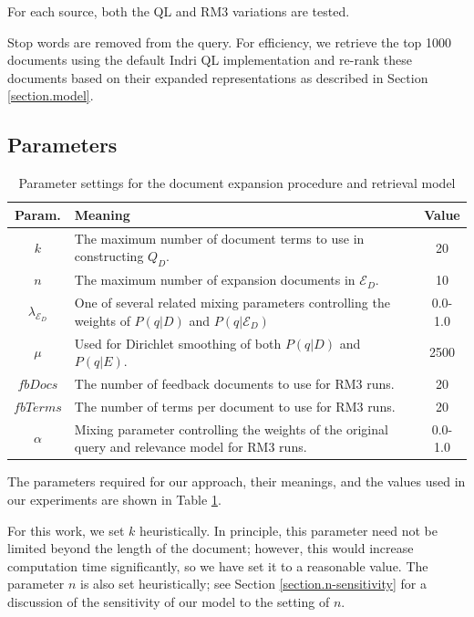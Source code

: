 \documentclass{sig-alternate}
\begin{document}
\noindent For each source, both the QL and RM3 variations are tested.

Stop words are removed from the query. For efficiency, we retrieve the top 1000 documents using the default Indri QL implementation and re-rank these documents based on their expanded representations as described in Section \ref{section.model}.

\subsection{Parameters}\label{section.evaluation.parameters}

\begin{table}[htb]
\centering
\begin{tabular}{|c|p{}|c|} \hline
{\bf Param.} & {\bf Meaning} & {\bf Value} \\ \hline
$k$ & The maximum number of document terms to use in constructing $Q_D$. & 20 \\ \hline
$n$ & The maximum number of expansion documents in $\mathcal{E}_D$. & 10 \\ \hline
$\lambda_{\mathcal{E}_D}$ & One of several related mixing parameters controlling the weights of $P(q|D)$ and $P(q|\mathcal{E}_D)$ & 0.0-1.0 \\ \hline
$\mu$ & Used for Dirichlet smoothing of both $P(q|D)$ and $P(q|E)$. & 2500 \\ \hline
$fbDocs$ & The number of feedback documents to use for RM3 runs. & 20 \\ \hline
$fbTerms$ & The number of terms per document to use for RM3 runs. & 20 \\ \hline
$\alpha$ & Mixing parameter controlling the weights of the original query and relevance model for RM3 runs. & 0.0-1.0 \\ \hline
\end{tabular}
\caption{Parameter settings for the document expansion procedure and retrieval model}
\label{table.parameters}
\end{table}

The parameters required for our approach, their meanings, and the values used in our experiments are shown in Table \ref{table.parameters}. 

For this work, we set $k$ heuristically. In principle, this parameter need not be limited beyond the length of the document; however, this would increase computation time significantly, so we have set it to a reasonable value. The parameter $n$ is also set heuristically; see Section \ref{section.n-sensitivity} for a discussion of the sensitivity of our model to the setting of $n$.
\end{document}
